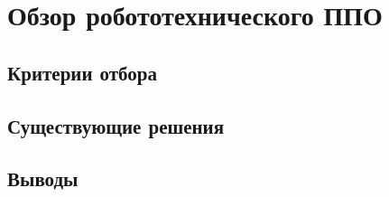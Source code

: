 \chapter{Обзор робототехнического ППО}
\section{Критерии отбора}

\section{Существующие решения}

\section{Выводы}